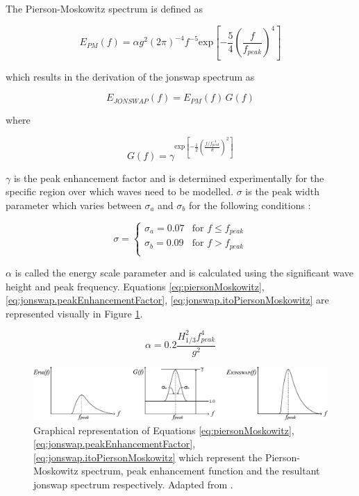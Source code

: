 The Pierson-Moskowitz spectrum is defined as

\begin{equation} \label{eq:piersonMoskowitz}
    E_{PM} (f) = \alpha g^{2}(2\pi)^{-4}f^{-5}\text{exp} \left [ -\frac{5}{4} \left ( \frac{f}{f_{peak}}\right ) ^{4} \right]
\end{equation}

which results in the derivation of the \acs{jonswap} spectrum as

\begin{equation} \label{eq:jonswap.itoPiersonMoskowitz}
    E_{JONSWAP} (f) = E_{PM} (f) \, G(f)
\end{equation}

where 

\begin{equation} \label{eq:jonswap.peakEnhancementFactor}
    G(f) = \gamma ^{\text{exp} \left [  - \frac{1}{2} \left ( \frac{f/f_{peak}^{-1}}{\sigma} \right )^2 \right ]}
\end{equation}

$\gamma$ is the peak enhancement factor and is determined experimentally for the specific region over which waves need to be modelled. $\sigma$ is the peak width parameter which varies between $\sigma_{a}$ and $\sigma_{b}$ for the following conditions \cite{Holthuijsen2007}:

\begin{equation*}
  \sigma =
    \begin{cases}
      \sigma_{a} = 0.07 & \text{for $f \leq f_{peak}$}\\
      \sigma_{b} = 0.09 & \text{for $f > f_{peak}$}\\
    \end{cases}       
\end{equation*}

$\alpha$ is called the energy scale parameter and is calculated using the significant wave height and peak frequency. Equations \ref{eq:piersonMoskowitz}, \ref{eq:jonswap.peakEnhancementFactor}, \ref{eq:jonswap.itoPiersonMoskowitz} are represented visually in Figure \ref{fig:theory.JONSWAPFromPM}.

\begin{equation} \label{eq:jonswap.alpha}
    \alpha = 0.2 \frac{H_{1/3}^2 f_{peak}^{4}}{g^{2}}
\end{equation}

\begin{figure}[htbp]
    \centering
    \includegraphics[width=.95\linewidth]{Figures/Theory/JONSWAPFromPM.pdf}
    \caption{Graphical representation of Equations \ref{eq:piersonMoskowitz}, \ref{eq:jonswap.peakEnhancementFactor}, \ref{eq:jonswap.itoPiersonMoskowitz} which represent the Pierson-Moskowitz spectrum, peak enhancement function and the resultant \acs{jonswap} spectrum respectively. Adapted from \cite{Holthuijsen2007}.}
    \label{fig:theory.JONSWAPFromPM}
\end{figure}


